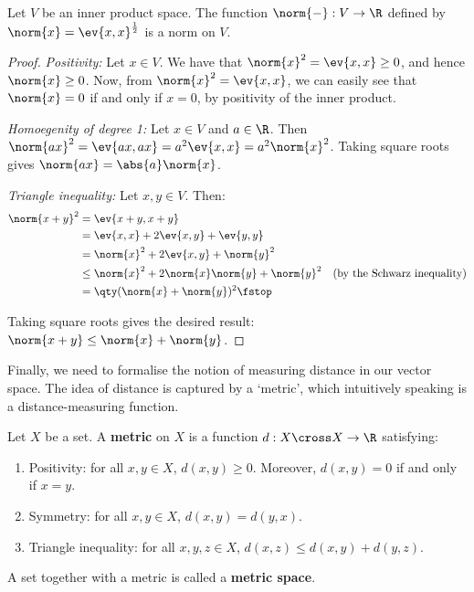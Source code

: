 \begin{theorem}
  Let \( V \) be an inner product space. The function \( \norm{-}:V\to\R \) defined by \( \norm{x}=\ev{x,x}^{\frac{1}{2}} \) is a norm on \( V \).
\end{theorem}
\begin{proof}
  \emph{Positivity:} Let \( x\in V \). We have that \( \norm{x}^2=\ev{x,x}\geq 0 \), and hence \( \norm{x}\geq 0 \). Now, from \( \norm{x}^2=\ev{x,x} \), we can easily see that \( \norm{x}=0 \) if and only if \( x=0 \), by positivity of the inner product.

  \vspace{3mm}

  \emph{Homoegenity of degree 1:} Let \( x\in V \) and \( a\in\R \). Then \( \norm{ax}^2=\ev{ax,ax}=a^2\ev{x,x}=a^2\norm{x}^2 \). Taking square roots gives \( \norm{ax}=\abs{a}\norm{x} \).

  \vspace{3mm}

  \emph{Triangle inequality:} Let \( x,y\in V \). Then:
  \begin{align*}
    \norm{x+y}^2&= \ev{x+y,x+y}\\
    &= \ev{x,x}+2\ev{x,y}+\ev{y,y}\\
    &= \norm{x}^2+2\ev{x,y}+\norm{y}^2\\
    &\leq \norm{x}^2+2\norm{x}\norm{y}+\norm{y}^2 &(\text{by the Schwarz inequality})\\
    &= \qty(\norm{x}+\norm{y})^2\fstop
  \end{align*}
  
  Taking square roots gives the desired result: \( \norm{x+y}\leq\norm{x}+\norm{y} \).
\end{proof}

Finally, we need to formalise the notion of measuring distance in our vector space. The idea of distance is captured by a `metric', which intuitively speaking is a distance-measuring function.

\begin{definition}
  Let \( X \) be a set. A \textbf{metric} on \( X \) is a function \( d:X\cross X\to\R \) satisfying:
  \begin{enumerate}[label=(\alph*)]
  \item Positivity: for all \( x,y\in X \), \( d(x,y)\geq 0 \). Moreover, \( d(x,y)=0 \) if and only if \( x=y \).
  \item Symmetry: for all \( x,y\in X\), \( d(x,y)=d(y,x) \).
  \item Triangle inequality: for all \( x,y,z\in X \), \( d(x,z)\leq d(x,y)+d(y,z) \).
  \end{enumerate}
  A set together with a metric is called a \textbf{metric space}.
\end{definition}


